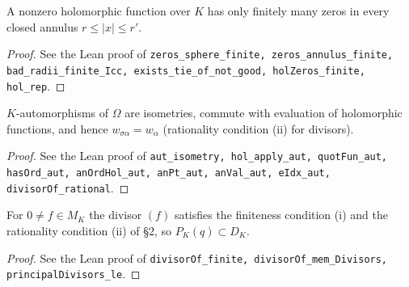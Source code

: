 \begin{proposition}
\label{prop:zeros-finite}
\leanok
A nonzero holomorphic function over $K$ has only finitely many zeros in every closed annulus $r\le|x|\le r'$.
\end{proposition}
\begin{proof}
\leanok
See the Lean proof of \texttt{zeros\_sphere\_finite, zeros\_annulus\_finite, bad\_radii\_finite\_Icc, exists\_tie\_of\_not\_good, holZeros\_finite, hol\_rep}.
\end{proof}

\begin{proposition}
\label{prop:rationality}
\leanok
$K$-automorphisms of $\Omega$ are isometries, commute with evaluation of holomorphic functions, and hence $w_{\sigma\alpha}=w_\alpha$ (rationality condition (ii) for divisors).
\end{proposition}
\begin{proof}
\leanok
See the Lean proof of \texttt{aut\_isometry, hol\_apply\_aut, quotFun\_aut, hasOrd\_aut, anOrdHol\_aut, anPt\_aut, anVal\_aut, eIdx\_aut, divisorOf\_rational}.
\end{proof}

\begin{proposition}
\label{prop:divisor-finite}
\leanok
For $0\ne f\in M_K$ the divisor $(f)$ satisfies the finiteness condition (i) and the rationality condition (ii) of \S2, so $P_K(q)\subset D_K$.
\end{proposition}
\begin{proof}
\leanok
See the Lean proof of \texttt{divisorOf\_finite, divisorOf\_mem\_Divisors, principalDivisors\_le}.
\end{proof}


